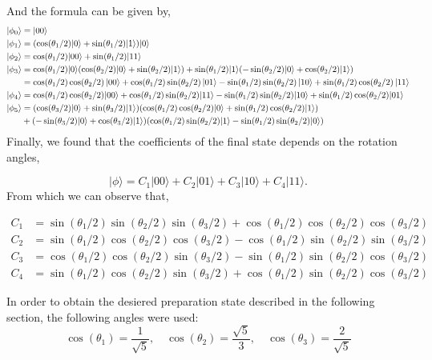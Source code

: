 \documentclass[11p]{article}
\begin{document}
And the formula can be given by,
\begin{align*}
|\phi_0\rangle &= |00 \rangle \\
|\phi_1\rangle &= (\cos(\theta_1/2)|0\rangle + \sin(\theta_1/2)|1\rangle)|0\rangle\\
|\phi_2\rangle & = \cos(\theta_1/2)|00\rangle + \sin(\theta_1/2)|11\rangle\\
|\phi_3\rangle &=\cos(\theta_1/2)|0\rangle(\cos(\theta_2/2)|0\rangle + \sin(\theta_2/2)|1\rangle) + \sin(\theta_1/2)|1\rangle(-\sin(\theta_2/2)|0\rangle + \cos(\theta_2/2)|1\rangle)\\
&=\cos(\theta_1/2)\cos(\theta_2/2)\ket{00}+\cos(\theta_1/2)\sin(\theta_2/2)\ket{01}-\sin(\theta_1/2)\sin(\theta_2/2)\ket{10}+\sin(\theta_1/2)\cos(\theta_2/2)\ket{11}\\
|\phi_4\rangle &=\cos(\theta_1/2)\cos(\theta_2/2)|00\rangle + \cos(\theta_1/2)\sin(\theta_2/2)|11\rangle- \sin(\theta_1/2)\sin(\theta_2/2)|10\rangle + \sin(\theta_1/2)\cos(\theta_2/2)|01\rangle\\
|\phi_5\rangle&=(\cos(\theta_3/2)|0\rangle + \sin(\theta_3/2)|1\rangle) 
(\cos(\theta_1/2)\cos(\theta_2/2)|0\rangle+\sin(\theta_1/2)\cos(\theta_2/2)|1\rangle)\\
&+(-\sin(\theta_3/2)|0\rangle + \cos(\theta_3/2)|1\rangle)
(\cos(\theta_1/2)\sin(\theta_2/2)|1\rangle- \sin(\theta_1/2)\sin(\theta_2/2)|0\rangle)
\end{align*}
Finally, we found that the coefficients of the final state depends on the rotation angles,

\[
    |\phi\rangle= C_1|00\rangle + C_2|01\rangle + C_3|10\rangle +C_4 |11\rangle.
\]
From which we can observe that,

\begin{align}
    C_1 &=     \sin(\theta_1/2)  \sin(\theta_2/2)  \sin(\theta_3/2) +  \cos(\theta_1/2) \cos(\theta_2/2)  \cos(\theta_3/2)\\
    C_2 &=   \sin(\theta_1/2)  \cos(\theta_2/2) \cos(\theta_3/2) -   \cos(\theta_1/2) \sin(\theta_2/2)  \sin(\theta_3/2)   \\
    C_3 &=   \cos(\theta_1/2)  \cos(\theta_2/2) \sin(\theta_3/2) -  \sin(\theta_1/2)  \sin(\theta_2/2)  \cos(\theta_3/2)\\
    C_4 &=   \sin(\theta_1/2)  \cos(\theta_2/2) \sin(\theta_3/2)  +    \cos(\theta_1/2) \sin(\theta_2/2) \cos(\theta_3/2)
\end{align}

In order to obtain the desiered preparation state described in the following section, the following angles were used:
\[
    \cos(\theta_1)=\frac{1}{\sqrt{5}}, \quad \cos(\theta_2)=\frac{\sqrt{5}}{3}, \quad \cos(\theta_3)=\frac{2}{\sqrt{5}}
\]
\end{document}
